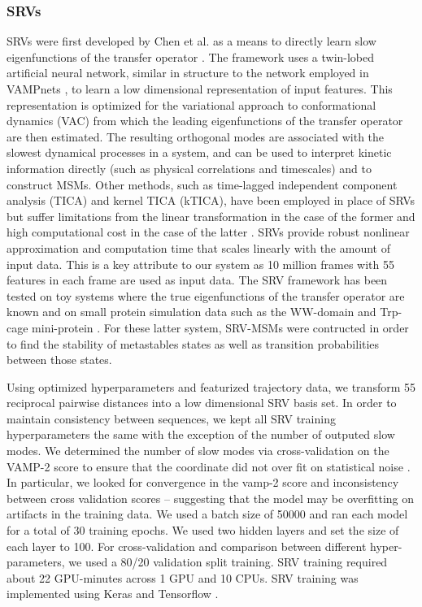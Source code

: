 \documentclass[journal=jpcbfk,manuscript=article]{achemso}
\begin{document}

\subsubsection{\label{sec:methods}SRVs}
 
SRVs were first developed by Chen et al. as a means to directly learn slow eigenfunctions of the transfer operator \citep{Chen}. The framework uses a twin-lobed artificial neural network, similar in structure to the network employed in VAMPnets \citep{Mardt2018VAMPnetsKinetics}, to learn a low dimensional representation of input features. This representation is optimized for the variational approach to conformational dynamics (VAC) from which the leading eigenfunctions of the transfer operator are then estimated. The resulting orthogonal modes are associated with the slowest dynamical processes in a system, and can be used to interpret kinetic information directly (such as physical correlations and timescales) and to construct MSMs. Other methods, such as time-lagged independent component analysis (TICA) and kernel TICA (kTICA), have been employed in place of SRVs but suffer limitations from the linear transformation in the case of the former and high computational cost in the case of the latter \citep{Molgedey1994SeparationCorrelations, Harrigan2017LandmarkDynamics}. SRVs provide robust nonlinear approximation and computation time that scales linearly with the amount of input data. This is a key attribute to our system as 10 million frames with 55 features in each frame are used as input data. The SRV framework has been tested on toy systems where the true eigenfunctions of the transfer operator are known and on small protein simulation data such as the WW-domain and Trp-cage mini-protein \citep{Chen, Sidky}. For these latter system, SRV-MSMs were contructed in order to find the stability of metastables states as well as transition probabilities between those states.


Using optimized hyperparameters and featurized trajectory data, we transform 55 reciprocal pairwise distances into a low dimensional SRV basis set. In order to maintain consistency between sequences, we kept all SRV training hyperparameters the same with the exception of the number of outputed slow modes. We determined the number of slow modes via cross-validation on the VAMP-2 score to ensure that the coordinate did not over fit on statistical noise \citep{McGibbon2015VariationalKinetics}. In particular, we looked for convergence in the vamp-2 score and inconsistency between cross validation scores -- suggesting that the model may be overfitting on artifacts in the training data. We used a batch size of 50000 and ran each model for a total of 30 training epochs. We used two hidden layers and set the size of each layer to 100. For cross-validation and comparison between different hyper-parameters, we used a 80/20 validation split training. SRV training required about 22 GPU-minutes across 1 GPU and 10 CPUs. SRV training was implemented using Keras and Tensorflow \citep{KerasGithub.Com, Abadi2016TensorFlow:Systems}.
\end{document}
